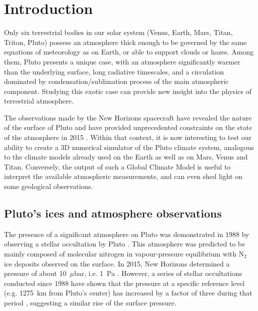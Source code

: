 \section{Introduction}
\label{sc:Intro}

Only six terrestrial bodies in our solar system (Venus, Earth, Mars, Titan, Triton, Pluto)
 possess an atmosphere thick enough to be governed
by the same equations of meteorology as on Earth, or able to support clouds or hazes. 
Among them, Pluto presents a unique case, with an atmosphere significantly warmer than the
underlying surface, long radiative timescales, and a circulation dominated by
condensation/sublimation process of the main atmospheric component. Studying this exotic 
case can provide new insight into the physics of terrestrial atmosphere. 

The observations made by the New Horizons spacecraft have 
revealed the nature of the surface of Pluto
and have provided unprecedented constraints on the state of the atmosphere in 2015
\citep{Ster:15,Glad:16,Grun:16,Moor:16}.
Within that context, it is now interesting to test our ability to create a 
3D numerical simulator of the Pluto climate system, analogous to the climate models already 
used on the Earth as well as on Mars, Venus and Titan.  
Conversely, the output of  such a Global Climate Model is useful to interpret the
available atmospheric measurements, and can even shed light on some geological observations.


\subsection{Pluto's ices and atmosphere observations}

The presence of a significant atmosphere on Pluto was demonstrated in 1988 by observing 
a stellar occultation by Pluto
\citep{Hubb:88,Elli:89}. This atmosphere was predicted 
to be mainly composed of molecular nitrogen in 
vapour-pressure equilibrium with N$_2$ ice deposits observed on the surface. 
In 2015, New Horizons determined a pressure of about 10~$\mu$bar, i.e. 1~Pa \citep{Hins:15dps,Glad:16}. 
However,  a series of stellar occultations conducted since 1988 have shown
that the pressure at a specific reference level (e.g. 1275~km 
from Pluto's center) has increased by a factor of three during that
period \citep{Elli:03,Sica:03,Olki:15}, suggesting a
similar rise of the surface pressure. 


